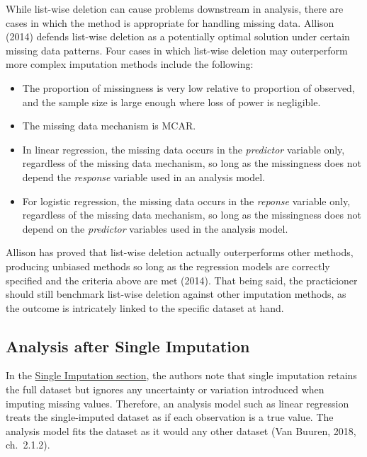 \documentclass[12pt,oneside]{chicagocapstone}
\providecommand{\tightlist}{%
  \setlength{\itemsep}{0pt}\setlength{\parskip}{0pt}}
\begin{document}
While list-wise deletion can cause problems downstream in analysis,
there are cases in which the method is appropriate for handling missing
data. Allison (2014) defends list-wise deletion as a potentially optimal
solution under certain missing data patterns. Four cases in which
list-wise deletion may outerperform more complex imputation methods
include the following:
\begin{itemize}
\tightlist
\item
  The proportion of missingness is very low relative to proportion of
  observed, and the sample size is large enough where loss of power is
  negligible.
\item
  The missing data mechanism is MCAR.
\item
  In linear regression, the missing data occurs in the \emph{predictor}
  variable only, regardless of the missing data mechanism, so long as
  the missingness does not depend the \emph{response} variable used in
  an analysis model.
\item
  For logistic regression, the missing data occurs in the \emph{reponse}
  variable only, regardless of the missing data mechanism, so long as
  the missingness does not depend on the \emph{predictor} variables used
  in the analysis model.
\end{itemize}
Allison has proved that list-wise deletion actually outerperforms other
methods, producing unbiased methods so long as the regression models are
correctly specified and the criteria above are met (2014). That being
said, the practicioner should still benchmark list-wise deletion against
other imputation methods, as the outcome is intricately linked to the
specific dataset at hand.

\subsection*{Analysis after Single
Imputation}\label{background-analysis-single}

In the \protect\hyperlink{background-single-imputation}{Single
Imputation section}, the authors note that single imputation retains the
full dataset but ignores any uncertainty or variation introduced when
imputing missing values. Therefore, an analysis model such as linear
regression treats the single-imputed dataset as if each observation is a
true value. The analysis model fits the dataset as it would any other
dataset (Van Buuren, 2018, ch.~2.1.2).
\end{document}
